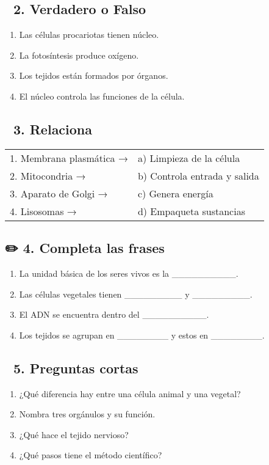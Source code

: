 \documentclass[a4paper,12pt]{article}
\begin{document}
\subsection*{🧠 2. Verdadero o Falso}
\begin{enumerate}[label=\arabic*)]
    \item Las células procariotas tienen núcleo.
    \item La fotosíntesis produce oxígeno.
    \item Los tejidos están formados por órganos.
    \item El núcleo controla las funciones de la célula.
\end{enumerate}

\subsection*{🔗 3. Relaciona}
\begin{tabular}{ll}
1. Membrana plasmática → & a) Limpieza de la célula \\
2. Mitocondria → & b) Controla entrada y salida \\
3. Aparato de Golgi → & c) Genera energía \\
4. Lisosomas → & d) Empaqueta sustancias \\
\end{tabular}

\subsection*{✏️ 4. Completa las frases}
\begin{enumerate}[label=\arabic*)]
    \item La unidad básica de los seres vivos es la \_\_\_\_\_\_\_\_\_\_.
    \item Las células vegetales tienen \_\_\_\_\_\_\_\_\_ y \_\_\_\_\_\_\_\_\_.
    \item El ADN se encuentra dentro del \_\_\_\_\_\_\_\_\_\_.
    \item Los tejidos se agrupan en \_\_\_\_\_\_\_\_ y estos en \_\_\_\_\_\_\_\_.
\end{enumerate}

\subsection*{💬 5. Preguntas cortas}
\begin{enumerate}[label=\arabic*)]
    \item ¿Qué diferencia hay entre una célula animal y una vegetal?
    \item Nombra tres orgánulos y su función.
    \item ¿Qué hace el tejido nervioso?
    \item ¿Qué pasos tiene el método científico?
\end{enumerate}
\end{document}
